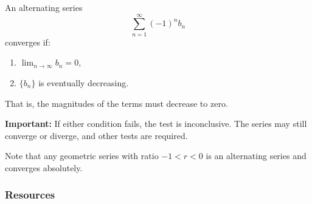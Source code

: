 An alternating series
\[
\sum_{n=1}^{\infty} (-1)^n b_n
\]
converges if:
\begin{enumerate}
\item $\displaystyle \lim_{n \to \infty} b_n = 0$,
\item $\{b_n\}$ is eventually decreasing.
\end{enumerate}

That is, the magnitudes of the terms must decrease to zero.

\medskip

\textbf{Important:} If either condition fails, the test is inconclusive. 
The series may still converge or diverge, and other tests are required.

\medskip

Note that any geometric series with ratio $-1 < r < 0$ is an alternating 
series and converges absolutely.

\subsubsection{Resources}
\label{sss:reso-alte}

